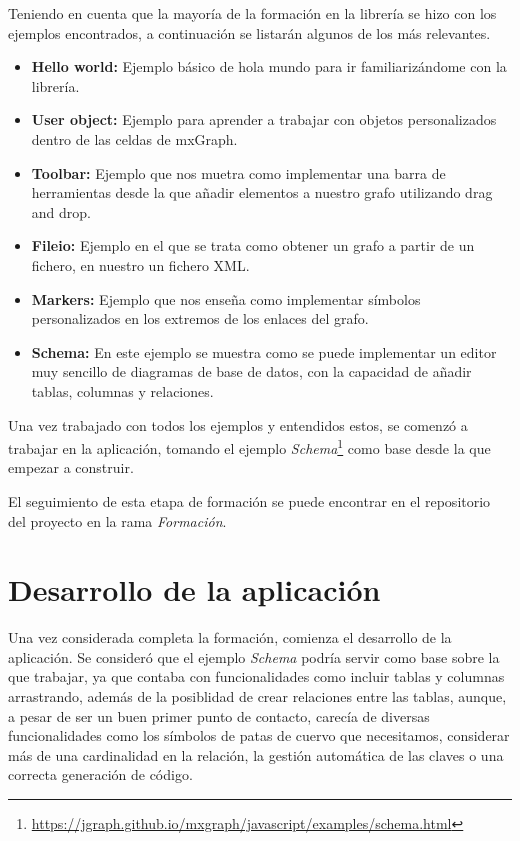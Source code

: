 Teniendo en cuenta que la mayoría de la formación en la librería se hizo con los ejemplos encontrados, a continuación se listarán algunos de los más relevantes.
\begin{itemize}
    \item \textbf{Hello world: }Ejemplo básico de hola mundo para ir familiarizándome con la librería.
    \item \textbf{User object: }Ejemplo para aprender a trabajar con objetos personalizados dentro de las celdas de mxGraph.
    \item \textbf{Toolbar: }Ejemplo que nos muetra como implementar una barra de herramientas desde la que añadir elementos a nuestro grafo utilizando drag and drop.
    \item \textbf{Fileio: }Ejemplo en el que se trata como obtener un grafo a partir de un fichero, en nuestro un fichero XML.
    \item \textbf{Markers: }Ejemplo que nos enseña como implementar símbolos personalizados en los extremos de los enlaces del grafo.
    \item \textbf{Schema: }En este ejemplo se muestra como se puede implementar un editor muy sencillo de diagramas de base de datos, con la capacidad de añadir tablas, columnas y relaciones.
\end{itemize}

Una vez trabajado con todos los ejemplos y entendidos estos, se comenzó a trabajar en la aplicación, tomando el ejemplo \emph{Schema}\footnote{\url{https://jgraph.github.io/mxgraph/javascript/examples/schema.html}} como base desde la que empezar a construir.

El seguimiento de esta etapa de formación se puede encontrar en el repositorio del proyecto en la rama \emph{Formación}.

\section{Desarrollo de la aplicación}

Una vez considerada completa la formación, comienza el desarrollo de la aplicación. Se consideró que el ejemplo \emph{Schema} podría servir como base sobre la que trabajar, ya que contaba con funcionalidades como incluir tablas y columnas arrastrando, además de la posiblidad de crear relaciones entre las tablas, aunque, a pesar de ser un buen primer punto de contacto, carecía de diversas funcionalidades como los símbolos de patas de cuervo que necesitamos, considerar más de una cardinalidad en la relación, la gestión automática de las claves o una correcta generación de código.

